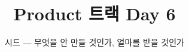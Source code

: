 \documentclass[aspectratio=169,11pt,t]{beamer}
\title{Product 트랙 Day 6}
\subtitle{시드 — 무엇을 안 만들 것인가, 얼마를 받을 것인가}
\begin{document}
\begin{frame}[plain,c]
\titlepage
\end{frame}

\end{document}
